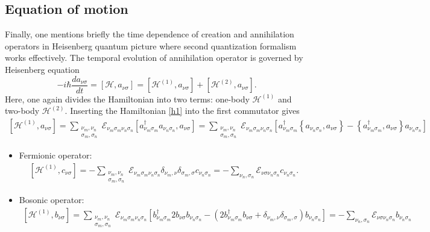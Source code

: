 \documentclass[a4paper,12pts]{article}
\numberwithin{equation}{section}
\begin{document}
	\subsection{Equation of motion}
	Finally, one mentions briefly the time dependence of creation and annihilation operators in Heisenberg quantum picture where second quantization formalism works effectively. The temporal evolution of annihilation operator is governed by Heisenberg equation
	\begin{equation}
	-i\hbar\frac{da_{\nu\sigma}}{dt} =  \left[\mathcal{H},a_{\nu\sigma}\right] = \left[\mathcal{H}^{(1)},a_{\nu\sigma}\right] + \left[\mathcal{H}^{(2)},a_{\nu\sigma}\right].
	\end{equation}
	Here, one again divides the Hamiltonian into two terms: one-body $\mathcal{H}^{(1)}$ and two-body $\mathcal{H}^{(2)}$. Inserting the Hamiltonian \ref{h1} into the first commutator gives
	\begin{align}
	\left[\mathcal{H}^{(1)},a_{\nu\sigma}\right] = \sum_{\substack{\nu_m,\nu_n\\ \sigma_m,\sigma_n}}\mathcal{E}_{\nu_m\sigma_m\nu_n\sigma_n}\left[a^{\dagger}_{\nu_m\sigma_m}a_{\nu_n\sigma_n},a_{\nu\sigma}\right] = \sum_{\substack{\nu_m,\nu_n\\ \sigma_m,\sigma_n}}\mathcal{E}_{\nu_m\sigma_m\nu_n\sigma_n}\left[ a^{\dagger}_{\nu_m\sigma_m}\left\lbrace a_{\nu_n\sigma_n},a_{\nu\sigma}\right\rbrace - \left\lbrace a^{\dagger}_{\nu_m\sigma_m},a_{\nu\sigma}\right\rbrace a_{\nu_n\sigma_n}\right]
	\end{align}
	\begin{itemize}
		\item Fermionic operator:
		\begin{align}
		\left[\mathcal{H}^{(1)},c_{\nu\sigma}\right] = -\sum_{\substack{\nu_m,\nu_n\\ \sigma_m,\sigma_n}}\mathcal{E}_{\nu_m\sigma_m\nu_n\sigma_n}\delta_{\nu_m,\nu}\delta_{\sigma_m,\sigma}c_{\nu_n\sigma_n} = -\sum_{\nu_n,\sigma_n}\mathcal{E}_{\nu\sigma\nu_n\sigma_n}c_{\nu_n\sigma_n}.
		\end{align}
		\item Bosonic operator:
		\begin{align}
		\left[\mathcal{H}^{(1)},b_{\nu\sigma}\right] = \sum_{\substack{\nu_m,\nu_n\\ \sigma_m,\sigma_n}}\mathcal{E}_{\nu_m\sigma_m\nu_n\sigma_n}\left[ b^{\dagger}_{\nu_m\sigma_m} 2b_{\nu\sigma}b_{\nu_n\sigma_n} - \left(2b^{\dagger}_{\nu_m\sigma_m}b_{\nu\sigma} + \delta_{\nu_m,\nu}\delta_{\sigma_m,\sigma}\right)b_{\nu_n\sigma_n}\right] = -\sum_{\nu_n,\sigma_n}\mathcal{E}_{\nu\sigma\nu_n\sigma_n}b_{\nu_n\sigma_n}
		\end{align}
	\end{itemize}
\end{document}

